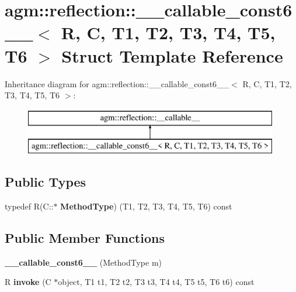 \hypertarget{structagm_1_1reflection_1_1____callable__const6____}{}\section{agm\+:\+:reflection\+:\+:\+\_\+\+\_\+callable\+\_\+const6\+\_\+\+\_\+$<$ R, C, T1, T2, T3, T4, T5, T6 $>$ Struct Template Reference}
\label{structagm_1_1reflection_1_1____callable__const6____}
Inheritance diagram for agm\+:\+:reflection\+:\+:\+\_\+\+\_\+callable\+\_\+const6\+\_\+\+\_\+$<$ R, C, T1, T2, T3, T4, T5, T6 $>$\+:\begin{figure}[H]
\begin{center}
\leavevmode
\includegraphics[height=2.000000cm]{structagm_1_1reflection_1_1____callable__const6____}
\end{center}
\end{figure}
\subsection*{Public Types}
\begin{DoxyCompactItemize}
\item 
typedef R(C\+::$\ast$ {\bfseries Method\+Type}) (T1, T2, T3, T4, T5, T6) const \hypertarget{structagm_1_1reflection_1_1____callable__const6_____a6c1382b6d7b2a5dd3e41a759182a3978}{}\label{structagm_1_1reflection_1_1____callable__const6_____a6c1382b6d7b2a5dd3e41a759182a3978}

\end{DoxyCompactItemize}
\subsection*{Public Member Functions}
\begin{DoxyCompactItemize}
\item 
{\bfseries \+\_\+\+\_\+callable\+\_\+const6\+\_\+\+\_\+} (Method\+Type m)\hypertarget{structagm_1_1reflection_1_1____callable__const6_____ae814ecfda15f8c62d04d9d467abf60ff}{}\label{structagm_1_1reflection_1_1____callable__const6_____ae814ecfda15f8c62d04d9d467abf60ff}

\item 
R {\bfseries invoke} (C $\ast$object, T1 t1, T2 t2, T3 t3, T4 t4, T5 t5, T6 t6) const \hypertarget{structagm_1_1reflection_1_1____callable__const6_____a4d99c1f92f3e65d122b60048d6b8b708}{}\label{structagm_1_1reflection_1_1____callable__const6_____a4d99c1f92f3e65d122b60048d6b8b708}

\end{DoxyCompactItemize}
